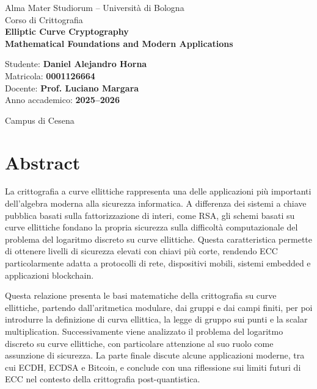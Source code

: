 \documentclass[12pt,a4paper,oneside]{report}
\begin{document}
\begin{titlepage}
    \centering
    {\Large Alma Mater Studiorum -- Università di Bologna\\}
    \vspace{0.4cm}
    {\large Corso di Crittografia\\}
    \vspace{2.5cm}
    {\Huge \textbf{Elliptic Curve Cryptography}\\}
    \vspace{0.4cm}
    {\Large \textbf{Mathematical Foundations and Modern Applications}\\}
    \vspace{2.5cm}
    \begin{flushleft}
        \large
        Studente: \textbf{Daniel Alejandro Horna}\\
        Matricola: \textbf{0001126664}\\
        Docente: \textbf{Prof. Luciano Margara}\\
        Anno accademico: \textbf{2025--2026}
    \end{flushleft}
    \vfill
    {\large Campus di Cesena\\}
\end{titlepage}


\chapter*{Abstract}

La crittografia a curve ellittiche rappresenta una delle applicazioni più importanti dell'algebra moderna alla sicurezza informatica. A differenza dei sistemi a chiave pubblica basati sulla fattorizzazione di interi, come RSA, gli schemi basati su curve ellittiche fondano la propria sicurezza sulla difficoltà computazionale del problema del logaritmo discreto su curve ellittiche. Questa caratteristica permette di ottenere livelli di sicurezza elevati con chiavi più corte, rendendo ECC particolarmente adatta a protocolli di rete, dispositivi mobili, sistemi embedded e applicazioni blockchain.

Questa relazione presenta le basi matematiche della crittografia su curve ellittiche, partendo dall'aritmetica modulare, dai gruppi e dai campi finiti, per poi introdurre la definizione di curva ellittica, la legge di gruppo sui punti e la scalar multiplication. Successivamente viene analizzato il problema del logaritmo discreto su curve ellittiche, con particolare attenzione al suo ruolo come assunzione di sicurezza. La parte finale discute alcune applicazioni moderne, tra cui ECDH, ECDSA e Bitcoin, e conclude con una riflessione sui limiti futuri di ECC nel contesto della crittografia post-quantistica.
\end{document}
